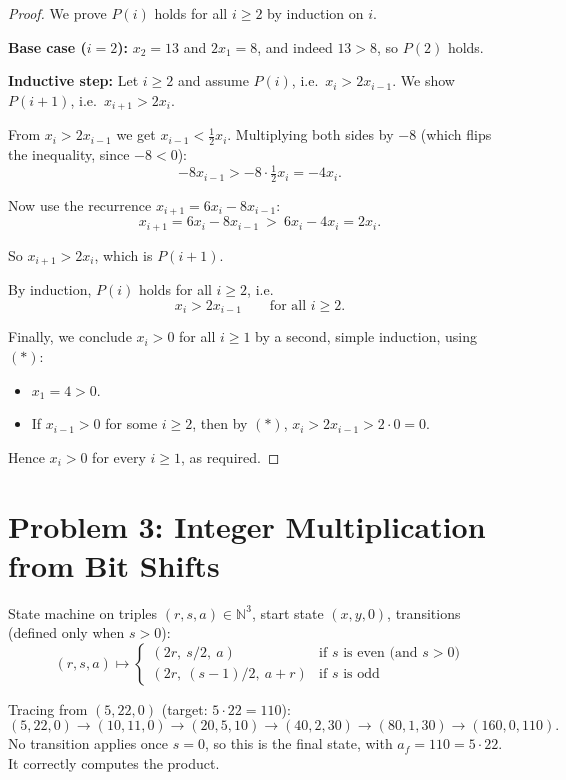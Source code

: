 \documentclass[11pt]{article}
\newcommand{\N}{\mathbb{N}}
\newcommand{\partlabel}[1]{%
    \noindent\makebox[2em][l]{\textbf{(#1)}}%
}
\begin{document}
\begin{proof}
We prove $P(i)$ holds for all $i \ge 2$ by induction on $i$.

\textbf{Base case ($i=2$):} $x_2 = 13$ and $2x_1 = 8$, and indeed $13 > 8$, so $P(2)$ holds.

\textbf{Inductive step:} Let $i \ge 2$ and assume $P(i)$, i.e.\ $x_i > 2x_{i-1}$. We show $P(i+1)$, i.e.\ $x_{i+1} > 2x_i$.

From $x_i > 2x_{i-1}$ we get $x_{i-1} < \tfrac{1}{2}x_i$. Multiplying both sides by $-8$ (which flips the inequality, since $-8 < 0$):
\[
-8x_{i-1} > -8\cdot\tfrac{1}{2}x_i = -4x_i.
\]

Now use the recurrence $x_{i+1} = 6x_i - 8x_{i-1}$:
\[
x_{i+1} = 6x_i - 8x_{i-1} \ >\ 6x_i - 4x_i = 2x_i.
\]

So $x_{i+1} > 2x_i$, which is $P(i+1)$.

By induction, $P(i)$ holds for all $i \ge 2$, i.e.\
\[
x_i > 2x_{i-1} \qquad \text{for all } i \ge 2. \tag{$\ast$}
\]

Finally, we conclude $x_i > 0$ for all $i \ge 1$ by a second, simple induction, using $(\ast)$:
\begin{itemize}
\item $x_1 = 4 > 0$.
\item If $x_{i-1} > 0$ for some $i \ge 2$, then by $(\ast)$, $x_i > 2x_{i-1} > 2\cdot 0 = 0$.
\end{itemize}
Hence $x_i > 0$ for every $i \ge 1$, as required.
\end{proof}

\newpage
\section*{Problem 3: Integer Multiplication from Bit Shifts}

State machine on triples $(r,s,a) \in \N^3$, start state $(x,y,0)$, transitions (defined only when $s > 0$):
\[
(r,s,a) \mapsto
\begin{cases}
(2r,\ s/2,\ a) & \text{if } s \text{ is even (and } s>0\text{)} \\
(2r,\ (s-1)/2,\ a+r) & \text{if } s \text{ is odd}
\end{cases}
\]

\medskip
\partlabel{a}
Tracing from $(5,22,0)$ (target: $5\cdot 22 = 110$):
\[
(5,22,0) \to (10,11,0) \to (20,5,10) \to (40,2,30) \to (80,1,30) \to (160,0,110).
\]
No transition applies once $s=0$, so this is the final state, with $a_f = 110 = 5 \cdot 22$. It correctly computes the product.
\end{document}
